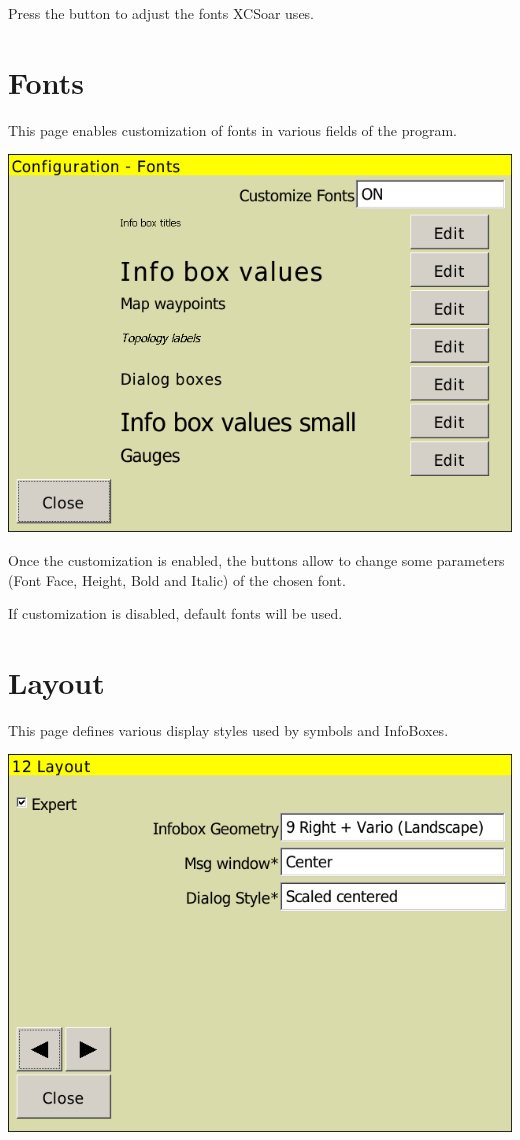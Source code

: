 Press the  button to adjust the fonts XCSoar uses.


\clearpage
\section{Fonts}

This page enables customization of fonts in various fields of the program.

\begin{center}
\includegraphics[angle=0,width=0.8\linewidth,keepaspectratio='true']{figures/config-fonts.png}
\end{center}

Once the customization is enabled, the  buttons allow to change some parameters (Font 
Face, Height, Bold and Italic) of the chosen font.

If customization is disabled, default fonts will be used.

\clearpage
\section{Layout}

This page defines various display styles used by symbols and InfoBoxes.

\begin{center}
\includegraphics[angle=0,width=0.8\linewidth,keepaspectratio='true']{figures/config-layout.png}
\end{center}

